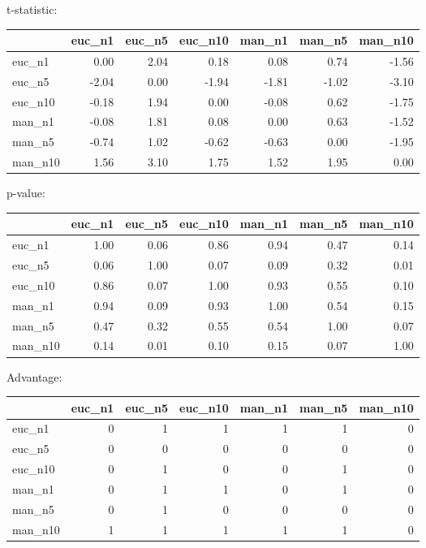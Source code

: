 t-statistic:
 \begin{tabular}{lrrrrrr}
\hline
         &   euc\_n1 &   euc\_n5 &   euc\_n10 &   man\_n1 &   man\_n5 &   man\_n10 \\
\hline
 euc\_n1  &     0.00 &     2.04 &      0.18 &     0.08 &     0.74 &     -1.56 \\
 euc\_n5  &    -2.04 &     0.00 &     -1.94 &    -1.81 &    -1.02 &     -3.10 \\
 euc\_n10 &    -0.18 &     1.94 &      0.00 &    -0.08 &     0.62 &     -1.75 \\
 man\_n1  &    -0.08 &     1.81 &      0.08 &     0.00 &     0.63 &     -1.52 \\
 man\_n5  &    -0.74 &     1.02 &     -0.62 &    -0.63 &     0.00 &     -1.95 \\
 man\_n10 &     1.56 &     3.10 &      1.75 &     1.52 &     1.95 &      0.00 \\
\hline
\end{tabular} 

p-value:
 \begin{tabular}{lrrrrrr}
\hline
         &   euc\_n1 &   euc\_n5 &   euc\_n10 &   man\_n1 &   man\_n5 &   man\_n10 \\
\hline
 euc\_n1  &     1.00 &     0.06 &      0.86 &     0.94 &     0.47 &      0.14 \\
 euc\_n5  &     0.06 &     1.00 &      0.07 &     0.09 &     0.32 &      0.01 \\
 euc\_n10 &     0.86 &     0.07 &      1.00 &     0.93 &     0.55 &      0.10 \\
 man\_n1  &     0.94 &     0.09 &      0.93 &     1.00 &     0.54 &      0.15 \\
 man\_n5  &     0.47 &     0.32 &      0.55 &     0.54 &     1.00 &      0.07 \\
 man\_n10 &     0.14 &     0.01 &      0.10 &     0.15 &     0.07 &      1.00 \\
\hline
\end{tabular} 

Advantage:
 \begin{tabular}{lrrrrrr}
\hline
         &   euc\_n1 &   euc\_n5 &   euc\_n10 &   man\_n1 &   man\_n5 &   man\_n10 \\
\hline
 euc\_n1  &        0 &        1 &         1 &        1 &        1 &         0 \\
 euc\_n5  &        0 &        0 &         0 &        0 &        0 &         0 \\
 euc\_n10 &        0 &        1 &         0 &        0 &        1 &         0 \\
 man\_n1  &        0 &        1 &         1 &        0 &        1 &         0 \\
 man\_n5  &        0 &        1 &         0 &        0 &        0 &         0 \\
 man\_n10 &        1 &        1 &         1 &        1 &        1 &         0 \\
\hline
\end{tabular} 

